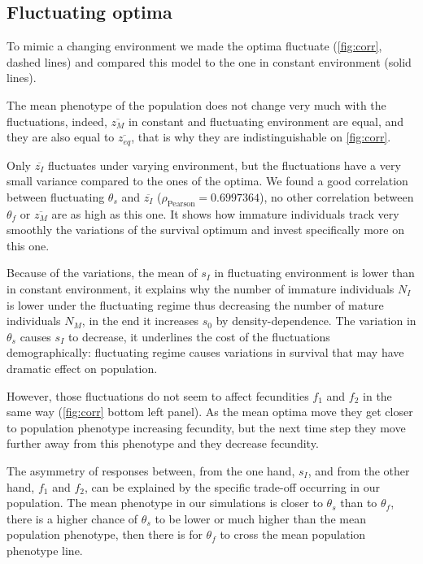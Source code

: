 \subsection*{Fluctuating optima}

To mimic a changing environment we made the optima fluctuate (\autoref{fig:corr}, dashed lines) and compared this model to the one in constant environment (solid lines).

The mean phenotype of the population does not change very much with the fluctuations, indeed, $\overline{z_M}$ in constant and fluctuating environment are equal, and they are also equal to $\overline{z_{eq}}$, that is why they are indistinguishable on \autoref{fig:corr}.

Only $\overline{z_I}$ fluctuates under varying environment, but the fluctuations have a very small variance compared to the ones of the optima. We found a good correlation between fluctuating $\theta_s$ and $\overline{z_I}$ ($\rho_{\text{Pearson}} = 0.6997364$), no other correlation between $\theta_f$ or $\overline{z_M}$ are as high as this one. It shows how immature individuals track very smoothly the variations of the survival optimum and invest specifically more on this one.

Because of the variations, the mean of $s_I$ in fluctuating environment is lower than in constant environment, it explains why the number of immature individuals $N_I$ is lower under the fluctuating regime thus decreasing the number of mature individuals $N_M$, in the end it increases $s_0$ by density-dependence. The variation in $\theta_s$ causes $s_I$ to decrease, it underlines the cost of the fluctuations demographically: fluctuating regime causes variations in survival that may have dramatic effect on population.

However, those fluctuations do not seem to affect fecundities $f_1$ and $f_2$ in the same way (\autoref{fig:corr} bottom left panel). As the mean optima move they get closer to population phenotype increasing fecundity, but the next time step they move further away from this phenotype and they decrease fecundity.

The asymmetry of responses between, from the one hand, $s_I$, and from the other hand, $f_1$ and $f_2$, can be explained by the specific trade-off occurring in our population. The mean phenotype in our simulations is closer to $\theta_s$ than to $\theta_f$, there is a higher chance of $\theta_s$ to be lower or much higher than the mean population phenotype, then there is for $\theta_f$ to cross the mean population phenotype line.

